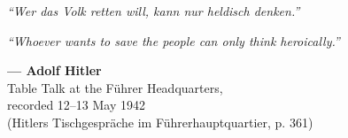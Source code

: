 \clearpage
\thispagestyle{empty}
\vspace*{\fill}

\begin{center}
\begin{minipage}{0.85\textwidth}
\centering
\large\itshape
``Wer das Volk retten will, kann nur heldisch denken.''

\vspace{2em}

\large\itshape
``Whoever wants to save the people can only think heroically.''

\vspace{3em}

\upshape\normalsize\textbf{— Adolf Hitler}\\
{\small Table Talk at the Führer Headquarters,}\\
{\small recorded 12–13 May 1942}\\
{\small (Hitlers Tischgespräche im Führerhauptquartier, p. 361)}
\end{minipage}
\end{center}

\vspace{3em}


\vspace*{\fill}
\clearpage